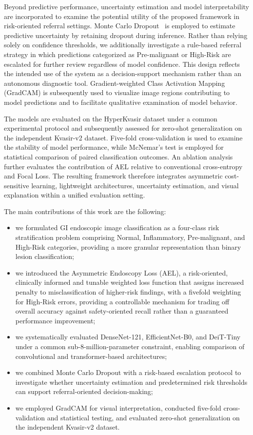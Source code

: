 \documentclass[11pt,a4paper]{article}
\begin{document}
Beyond predictive performance, uncertainty estimation and model interpretability are incorporated to examine the potential utility of the proposed framework in risk-oriented referral settings. Monte Carlo Dropout~\citep{Gal2016} is employed to estimate predictive uncertainty by retaining dropout during inference. Rather than relying solely on confidence thresholds, we additionally investigate a rule-based referral strategy in which predictions categorized as Pre-malignant or High-Risk are escalated for further review regardless of model confidence. This design reflects the intended use of the system as a decision-support mechanism rather than an autonomous diagnostic tool. Gradient-weighted Class Activation Mapping (GradCAM) is subsequently used to visualize image regions contributing to model predictions and to facilitate qualitative examination of model behavior.

The models are evaluated on the HyperKvasir dataset under a common experimental protocol and subsequently assessed for zero-shot generalization on the independent Kvasir-v2 dataset. Five-fold cross-validation is used to examine the stability of model performance, while McNemar's test is employed for statistical comparison of paired classification outcomes. An ablation analysis further evaluates the contribution of AEL relative to conventional cross-entropy and Focal Loss. The resulting framework therefore integrates asymmetric cost-sensitive learning, lightweight architectures, uncertainty estimation, and visual explanation within a unified evaluation setting.

The main contributions of this work are the following:

\begin{itemize}
\item we formulated GI endoscopic image classification as a four-class risk stratification problem comprising Normal, Inflammatory, Pre-malignant, and High-Risk categories, providing a more granular representation than binary lesion classification;
\item we introduced the Asymmetric Endoscopy Loss (AEL), a risk-oriented, clinically informed and tunable weighted loss function that assigns increased penalty to misclassification of higher-risk findings, with a fivefold weighting for High-Risk errors, providing a controllable mechanism for trading off overall accuracy against safety-oriented recall rather than a guaranteed performance improvement;
\item we systematically evaluated DenseNet-121, EfficientNet-B0, and DeiT-Tiny under a common sub-8-million-parameter constraint, enabling comparison of convolutional and transformer-based architectures;
\item we combined Monte Carlo Dropout with a risk-based escalation protocol to investigate whether uncertainty estimation and predetermined risk thresholds can support referral-oriented decision-making;
\item we employed GradCAM for visual interpretation, conducted five-fold cross-validation and statistical testing, and evaluated zero-shot generalization on the independent Kvasir-v2 dataset.
\end{itemize}
\end{document}
